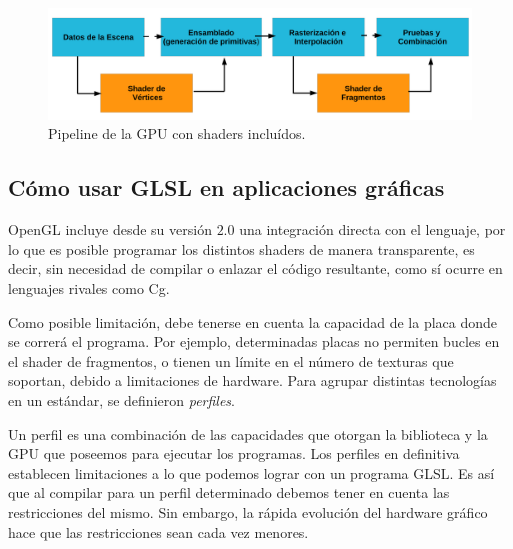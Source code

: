 \begin{figure}[h]
\begin{center}
\includegraphics[width=13cm]{figures/pipelinegrafico}
\caption{Pipeline de la GPU con shaders incluídos.}
\end{center}
\label{fg:pipelinegrafico}
\end{figure}


\subsection{C\'omo usar GLSL en aplicaciones gr\'aficas}
OpenGL incluye desde su versión $2.0$ una integración directa con el lenguaje, por lo que es posible programar los distintos shaders de manera transparente, es decir, sin necesidad de compilar o enlazar el código resultante, como sí ocurre en lenguajes rivales como Cg.

Como posible limitación, debe tenerse en cuenta la capacidad de la placa donde se correrá el programa.
Por ejemplo, determinadas placas no permiten bucles en el shader de fragmentos, o tienen un límite en el número de texturas que soportan, debido a limitaciones de hardware.
Para agrupar distintas tecnologías en un estándar, se definieron {\em perfiles}.

Un perfil es una combinaci\'on de las capacidades que otorgan la biblioteca y la GPU que poseemos para ejecutar los programas. Los perfiles en definitiva establecen limitaciones a lo que podemos lograr con un programa GLSL. Es as\'i que al compilar para un perfil determinado debemos tener en cuenta las restricciones del mismo. Sin embargo, la r\'apida evoluci\'on del hardware gr\'afico hace que las restricciones sean cada vez menores.


